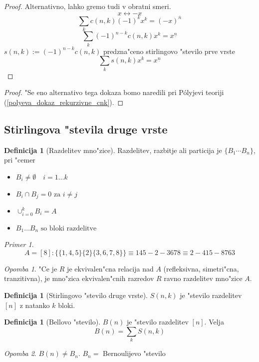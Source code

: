 \documentclass[a4paper,12pt]{article}
\theoremstyle{definition}
\newtheorem{defn}[counter]{Definicija}
\theoremstyle{remark}
\newtheorem*{ex}{Primer}
\newtheorem*{rem}{Opomba}
\begin{document}
\begin{proof}
	Alternativno, lahko gremo tudi v obratni smeri.
	\[x \leftrightarrow -x\] \label{TODO: I see x <-> -x, I skip.}
	\[\sum_k c(n,k) (-1)^k x^k = (-x)^{\overline{n}}\]
	\[\sum_k (-1)^{n-k} c(n,k) x^k = x^{\underline{n}}\]
	$s(n,k) := (-1)^{n-k} c(n,k)$ predzna"ceno stirlingovo "stevilo prve vrste
	\[\sum_k s(n,k) x^k = x^{\underline{n}}\]
\end{proof}

\begin{proof}
	"Se eno alternativo tega dokaza bomo naredili pri P\'olyjevi teoriji (\ref{polyeva_dokaz_rekurzivne_cnk}).
\end{proof}

\subsection{Stirlingova "stevila druge vrste}
\begin{defn}[Razdelitev mno"zice]
    Razdelitev, razbitje ali particija je $\{B_1 \cdots B_n\}$, pri "cemer
    \begin{itemize}
        \item $B_i \neq \emptyset \quad i = 1 \ldots k$
        \item $B_i \cap B_j = 0 \text{ za } i \neq j$
        \item $\cup_{i=0}^k B_i = A$
        \item $B_1 \dots B_n \text{ so bloki razdelitve}$
    \end{itemize}
\end{defn}

\begin{ex}
	\[A = [8]: \{ \{1, 4, 5\} \{2\} \{3, 6, 7, 8\}\} \equiv 145-2-3678 \equiv 2-415-8763\]
\end{ex}
\begin{rem}
	"Ce je $R$ je ekvivalen"cna relacija nad $A$ (refleksivna, simetri"cna, tranzitivna), je mno"zica ekvivalen"cnih razredov $R$ ravno razdelitev mno"zice $A$.
\end{rem}

\begin{defn}[Stirlingovo "stevilo druge vrste]
    $S(n,k)$ je "stevilo razdelitev $[n]$ z natanko $k$ bloki.
\end{defn}
\begin{defn}[Bellovo "stevilo]
	$B(n)$ je "stevilo razdelitev $[n]$. Velja
	\[B(n) = \sum_k S(n,k)\]
\end{defn}

\begin{rem}
	$B(n) \neq B_n$. $B_n =$ Bernoulijevo "stevilo
\end{rem}
\end{document}
